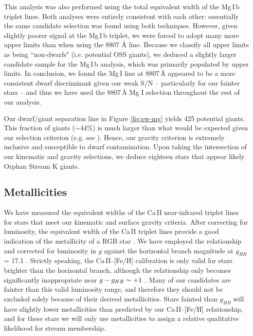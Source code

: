 \documentclass{emulateapj}
\begin{document}
This analysis was also performed using the total equivalent width of the Mg\,\textsc{I}\,b triplet lines. Both analyses were entirely consistent with each other: essentially the same candidate selection was found using both techniques. However, given slightly poorer signal at the Mg\,\textsc{I}\,b triplet, we were forced to adopt many more upper limits than when using the 8807 {\AA} line. Because we classify all upper limits as being ``non-dwarfs" (i.e. potential OSS giants), we deduced a slightly larger candidate sample for the Mg\,\textsc{I}\,b analysis, which was primarily populated by upper limits. In conclusion, we found the Mg\,\textsc{I} line at 8807{\,\AA} appeared to be a more consistent dwarf discriminant given our weak S/N \--- particularly for our fainter stars \--- and thus we have used the 8807\,{\AA} Mg \textsc{I} selection throughout the rest of our analysis.

Our dwarf/giant separation line in Figure \ref{fig:ew-mg} yields 425 potential giants. This fraction of giants ($\sim{}44\%$) is much larger than what would be expected given our selection criterion (e.g. see \citet{Casey;et-al_2012a}). Hence, our gravity criterion is extremely inclusive and susceptible to dwarf contamination. Upon taking the intersection of our kinematic and gravity selections, we deduce eighteen stars that appear likely Orphan Stream K giants.


\subsection{Metallicities}
\label{sec:metallicities}

We have measured the equivalent widths of the Ca\,\textsc{II} near-infrared triplet lines for stars that meet our kinematic and surface gravity criteria. After correcting for luminosity, the equivalent width of the Ca\,\textsc{II} triplet lines provide a good indication of the metallicity of a RGB star \citep{Amandroff;Da_Costa_1991}. We have employed the \citet{Starkenburg;et-al_2010} relationship and corrected for luminosity in $g$ against the horizontal branch magnitude at $g_{HB}$ = 17.1 \citep{Newberg;et-al_2010}. Strictly speaking, the Ca\,\textsc{II}\---[Fe/H] calibration is only valid for stars brighter than the horizontal branch, although the relationship only becomes significantly inappropriate near $g \-- g_{HB} \sim +1$ \citep{Saviane;et-al_2012}. Many of our candidates are fainter than this valid luminosity range, and therefore they should not be excluded solely because of their derived metallicities. Stars fainted than $g_{HB}$ will have slightly lower metallicities than predicted by our Ca\,\textsc{II}\---[Fe/H] relationship, and for these stars we will only use metallicities to assign a relative qualitative likelihood for stream membership.
\end{document}
